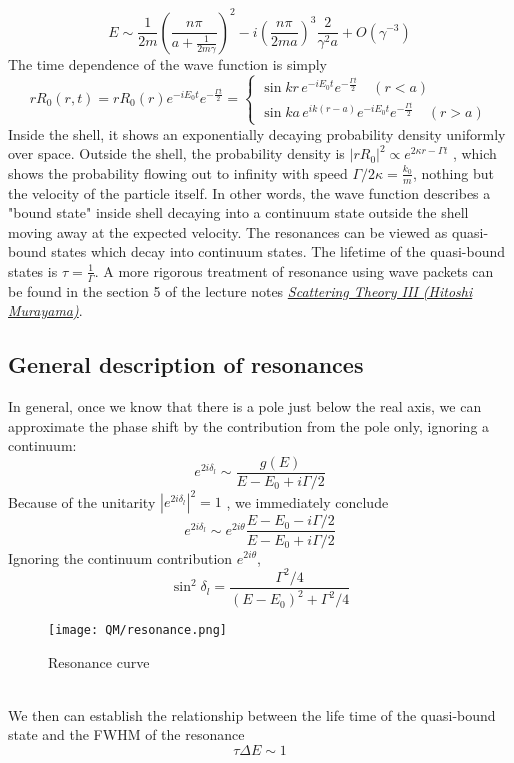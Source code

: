 \[E \sim \frac{1}{2m} \left( \frac{n\pi}{a + \frac{1}{2m\gamma}}\right)^2 - i \left( \frac{n\pi}{2ma}\right)^3 \frac{2}{\gamma^2 a} + O(\gamma^{-3})\]
The time dependence of the wave function is simply
\[rR_0(r,t) = rR_0(r) e^{-iE_0t} e^{-\frac{\Gamma t}{2}} = \begin{cases} \sin kr \, e^{-iE_0t} e^{-\frac{\Gamma t}{2}} \quad (r<a) \\\sin ka \,  e^{ik(r-a)} e^{-iE_0t} e^{-\frac{\Gamma t}{2}} \quad (r > a) \end{cases}\]
Inside the shell, it shows an exponentially decaying probability density uniformly over space.
Outside the shell, the probability density is $|rR_0|^2 \propto e^{2\kappa r-\Gamma t}$ , which shows the probability flowing out to infinity with speed $\Gamma/2\kappa = \frac{k_0}{m}$,
nothing but the velocity of the particle itself. In other words, the wave function describes a "bound state" inside shell decaying into a continuum state outside the shell moving away at the expected velocity. The resonances can be viewed as
quasi-bound states which decay into continuum states. The lifetime of the quasi-bound states is $\tau = \frac{1}{\Gamma}$.
A more rigorous treatment of resonance using wave packets can be found in the section 5 of the lecture notes 
\href{http://hitoshi.berkeley.edu/221B/index.html}{\emph{Scattering Theory III (Hitoshi Murayama)}}.

\subsection{General description of resonances}
In general, once we know that there is a pole just below the real axis, we can approximate the phase shift by the contribution from the pole only, ignoring a continuum:
\[e^{2i\delta_l} \sim \frac{g(E)}{E-E_0 + i\Gamma/2}\]
Because of the unitarity $|e^{2i\delta_l}|^2 = 1$ , we immediately conclude
\[ e^{2i\delta_l} \sim e^{2i\theta}\frac{E-E_0-i\Gamma/2}{E-E_0 + i\Gamma/2} \]
Ignoring the continuum contribution $e^{2i\theta}$,
\[\sin^2 \delta_l = \frac{\Gamma^2/4}{(E-E_0)^2+\Gamma^2/4}\]
\begin{figure}[!h]
	\centering
	\texttt{[image: QM/resonance.png]}
	\caption{Resonance curve}
\end{figure}\\
We then can establish the relationship between the life time of the quasi-bound state and the FWHM of the resonance
\[\tau \Delta E \sim 1\]

